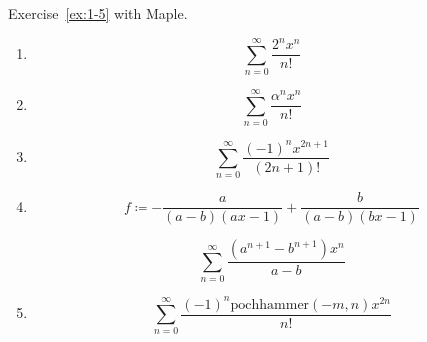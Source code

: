 \begin{exercise}
    Exercise~\ref{ex:1-5} with Maple.
\end{exercise}
\begin{solution}
    \begin{enumerate}[label=(\alph*)]
        \item \begin{mapleinput}
\end{mapleinput} \begin{mapleoutput}
    \[\sum_{n=0}^\infty \frac{2^{n} x^{n}}{n!}\]
\end{mapleoutput}
        \item \begin{mapleinput}
\end{mapleinput} \begin{mapleoutput}
    \[\sum_{n=0}^\infty \frac{\alpha^{n} x^{n}}{n!}\]
\end{mapleoutput}
    \item \begin{mapleinput}
\end{mapleinput} \begin{mapleoutput}
    \[\sum_{n=0}^\infty \frac{\left(-1\right)^{n} x^{2 n+1}}{\left(2 n+1\right)!}\]
\end{mapleoutput}
    \item \begin{mapleinput}
\end{mapleinput} \begin{mapleoutput}
    \[f\coloneqq -\frac{a}{\left(a-b\right) \left(a x-1\right)}+\frac{b}{\left(a-b\right) \left(b x-1\right)}\]
\end{mapleoutput} \begin{mapleinput}
\end{mapleinput} \begin{mapleoutput}
    \[\sum_{n=0}^\infty \frac{\left(a^{n+1}-b^{n+1}\right) x^{n}}{a-b}\]
\end{mapleoutput}
    \item \begin{mapleinput}
\end{mapleinput} \begin{mapleoutput}
    \[\sum_{n=0}^\infty \frac{\left(-1\right)^{n} \mathrm{pochhammer}\! \left(-m,n\right) x^{2 n}}{n!}\]
\end{mapleoutput}
    \end{enumerate}
\end{solution}

